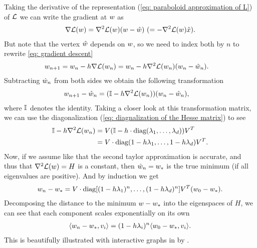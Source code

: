 Taking the derivative of the representation (\ref{eq: paraboloid approximation
of L}) of \(\mathcal{L}\) we can write the gradient at \(w\) as
%
\begin{align}\label{eq: hesse representation of gradient}
	\nabla \mathcal{L}(w)
	=  \nabla^2 \mathcal{L}(w)(w-\hat{w})
	\ (= -\nabla^2 \mathcal{L}(w)\hat{x}).
\end{align}
%
But note that the vertex \(\hat{w}\) depends on \(w\), so we need
to index both by \(n\) to rewrite \ref{eq: gradient descent}
%
\begin{align*}
	w_{n+1} &= w_n - h\nabla \mathcal{L}(w_n)
	= w_n - h\nabla^2 \mathcal{L}(w_n)(w_n - \hat{w}_n).
\end{align*}
%
Subtracting \(\hat{w}_n\) from both sides we obtain the following
transformation 
%
\begin{align}\label{eq: Matrix GD Formulation}
	w_{n+1} - \hat{w}_n
	&= (\mathbb{I} - h\nabla^2 \mathcal{L}(w_n) ) (w_n - \hat{w}_n),
\end{align}
where \(\mathbb{I}\) denotes the identity.
Taking a closer look at this transformation matrix, we can use the
diagonalization (\ref{eq: diagnalization of the Hesse matrix}) to see
%
\begin{align*}
	\mathbb{I} - h\nabla^2 \mathcal{L}(w_n)
	&= V(\mathbb{I} - h\cdot\text{diag}(\lambda_1,\dots,\lambda_d) )V^T \\
	&= V\cdot\text{diag}(1-h\lambda_1, \dots,1-h\lambda_d)V^T.
\end{align*}
%
Now, if we assume like \textcite{gohWhyMomentumReally2017} that the second
taylor approximation is accurate, and thus that \(\nabla^2 \mathcal{L}(w)=H\) is a
constant, then \(\hat{w}_n = w_*\) is the true minimum (if all
eigenvalues are positive). And by induction we get
%
\begin{align}
	w_n - w_*
	= V\cdot\text{diag}[(1-h\lambda_1)^n,\dots,(1-h\lambda_d)^n] V^T (w_0 - w_*).
\end{align}
%
Decomposing the distance to the minimum \(w - w_*\) into the
eigenspaces of \(H\), we can see that each component scales exponentially on its
own 
%
\begin{align*}
	\langle w_n -w_*, v_i\rangle
	= (1-h\lambda_i)^n \langle w_0 - w_*, v_i\rangle.
\end{align*}
%
This is beautifully illustrated with interactive graphs in
 by \citeauthor{gohWhyMomentumReally2017}.

